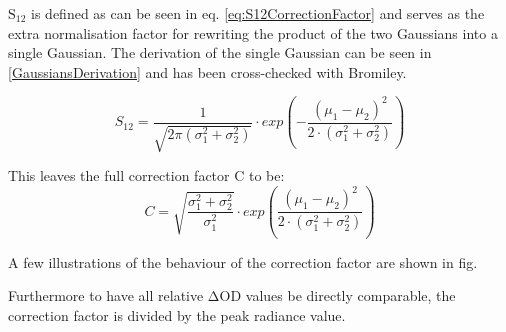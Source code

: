 \documentclass[twoside,openright]{scrreprt}
\begin{document}
$\mathrm{S_{12}}$ is defined as can be seen in eq. \ref{eq:S12CorrectionFactor} and serves as the extra normalisation factor for rewriting the product of the two Gaussians into a single Gaussian. The derivation of the single Gaussian can be seen in \ref{GaussiansDerivation} and has been cross-checked with Bromiley.\cite{Bromiley2014}

\begin{equation}\label{eq:S12CorrectionFactor}
S_{12} = \dfrac{1}{\sqrt{2\pi\left(\sigma_1^2+\sigma_2^2\right)}}\cdot exp\left(-\dfrac{\left(\mu_1 - \mu_2\right)^2}{2\cdot \left(\sigma_1^2+\sigma_2^2\right)}\right)
\end{equation}

This leaves the full correction factor C to be:
\begin{equation}\label{eq:fullCorrectionFactor}
C = \sqrt{\frac{\sigma_1^2+\sigma_2^2}{\sigma_1^2}}\cdot exp \left(\frac{\left(\mu_1-\mu_2\right)^2}{2\cdot \left(\sigma_1^2+\sigma_2^2\right)}\right)
\end{equation}

A few illustrations of the behaviour of the correction factor are shown in fig.

Furthermore to have all relative $\mathrm{\Delta OD}$ values be directly comparable, the correction factor is divided by the peak radiance value.
\end{document}
